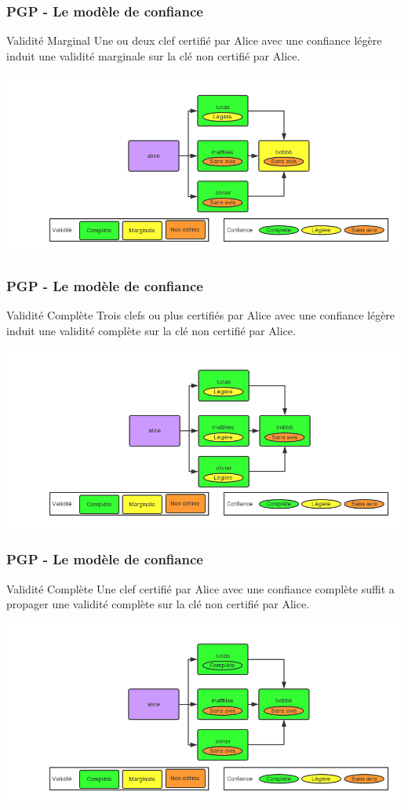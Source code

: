 \begin{frame}
  \frametitle{\color{white}PGP - Le modèle de confiance}
    \begin{block}{Validité Marginal}
      Une ou deux clef certifié par Alice avec une confiance légère 
      induit une validité marginale sur la clé non certifié par Alice.
    \end{block}
    \includegraphics[scale=0.3]{tdcdemoMarginal.png}
\end{frame}
\begin{frame}
  \frametitle{\color{white}PGP - Le modèle de confiance}
    \begin{block}{Validité Complète}
      Trois clefs ou plus certifiés par Alice avec une confiance légère
      induit une validité complète sur la clé non certifié par Alice.
    \end{block}
    \includegraphics[scale=0.3]{tdcdemoComplete1.png}
\end{frame}
\begin{frame}
  \frametitle{\color{white}PGP - Le modèle de confiance}
    \begin{block}{Validité Complète}
      Une clef certifié par Alice avec une confiance complète
      suffit a propager une validité complète sur la clé non certifié par Alice.
    \end{block}
    \includegraphics[scale=0.3]{tdcdemoComplete2.png}
\end{frame}

